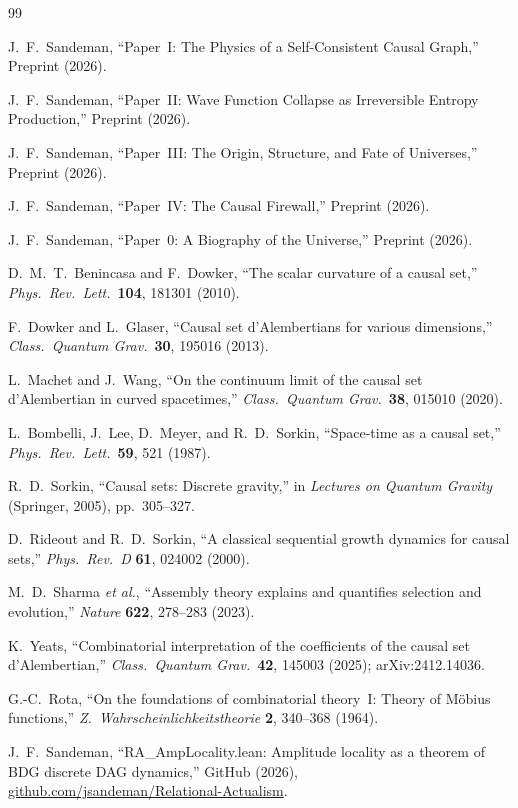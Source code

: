 \documentclass[11pt,a4paper]{article}
\theoremstyle{plain}
\theoremstyle{definition}
\theoremstyle{remark}
\begin{document}
\begin{thebibliography}{99}

J.~F.~Sandeman,
``Paper~I: The Physics of a Self-Consistent Causal Graph,''
Preprint (2026).

J.~F.~Sandeman,
``Paper~II: Wave Function Collapse as Irreversible Entropy Production,''
Preprint (2026).

J.~F.~Sandeman,
``Paper~III: The Origin, Structure, and Fate of Universes,''
Preprint (2026).

J.~F.~Sandeman,
``Paper~IV: The Causal Firewall,''
Preprint (2026).

J.~F.~Sandeman,
``Paper~0: A Biography of the Universe,''
Preprint (2026).

D.~M.~T.~Benincasa and F.~Dowker,
``The scalar curvature of a causal set,''
\textit{Phys.\ Rev.\ Lett.}\ \textbf{104}, 181301 (2010).

F.~Dowker and L.~Glaser,
``Causal set d'Alembertians for various dimensions,''
\textit{Class.\ Quantum Grav.}\ \textbf{30}, 195016 (2013).

L.~Machet and J.~Wang,
``On the continuum limit of the causal set d'Alembertian in curved spacetimes,''
\textit{Class.\ Quantum Grav.}\ \textbf{38}, 015010 (2020).

L.~Bombelli, J.~Lee, D.~Meyer, and R.~D.~Sorkin,
``Space-time as a causal set,''
\textit{Phys.\ Rev.\ Lett.}\ \textbf{59}, 521 (1987).

R.~D.~Sorkin,
``Causal sets: Discrete gravity,''
in \textit{Lectures on Quantum Gravity}
(Springer, 2005), pp.~305--327.

D.~Rideout and R.~D.~Sorkin,
``A classical sequential growth dynamics for causal sets,''
\textit{Phys.\ Rev.\ D} \textbf{61}, 024002 (2000).

M.~D.~Sharma \textit{et al.},
``Assembly theory explains and quantifies selection and evolution,''
\textit{Nature} \textbf{622}, 278--283 (2023).

K.~Yeats,
``Combinatorial interpretation of the coefficients of the causal set
d'Alembertian,''
\textit{Class.\ Quantum Grav.}\ \textbf{42}, 145003 (2025);
arXiv:2412.14036.

G.-C.~Rota,
``On the foundations of combinatorial theory~I: Theory of M\"obius functions,''
\textit{Z.\ Wahrscheinlichkeitstheorie} \textbf{2}, 340--368 (1964).

J.~F.~Sandeman,
``RA\_AmpLocality.lean: Amplitude locality as a theorem of BDG discrete DAG
dynamics,''
GitHub (2026), \url{github.com/jsandeman/Relational-Actualism}.

\end{thebibliography}
\end{document}
